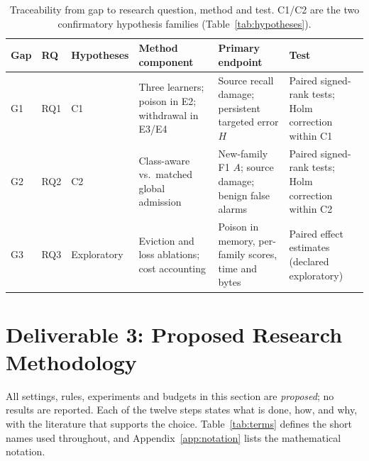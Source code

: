 \documentclass[10pt,a4paper]{article}
\begin{document}
\begin{table}[htbp]
\centering\footnotesize
\caption{Traceability from gap to research question, method and test. C1/C2 are the two confirmatory hypothesis families (Table~\ref{tab:hypotheses}).}
\label{tab:trace}
\begin{tabularx}{\linewidth}{L{0.7cm}L{0.8cm}L{1.8cm}Y Y Y}
\toprule
Gap & RQ & Hypotheses & Method component & Primary endpoint & Test\\
\midrule
G1 & RQ1 & C1 & Three learners; poison in E2; withdrawal in E3/E4 & Source recall damage; persistent targeted error $H$ & Paired signed-rank tests; Holm correction within C1\\
G2 & RQ2 & C2 & Class-aware vs.\ matched global admission & New-family F1 $A$; source damage; benign false alarms & Paired signed-rank tests; Holm correction within C2\\
G3 & RQ3 & Exploratory & Eviction and loss ablations; cost accounting & Poison in memory, per-family scores, time and bytes & Paired effect estimates (declared exploratory)\\
\bottomrule
\end{tabularx}
\end{table}

\section{Deliverable 3: Proposed Research Methodology}
All settings, rules, experiments and budgets in this section are \emph{proposed}; no results are reported. Each of the twelve steps states what is done, how, and why, with the literature that supports the choice. Table~\ref{tab:terms} defines the short names used throughout, and Appendix~\ref{app:notation} lists the mathematical notation.
\end{document}
